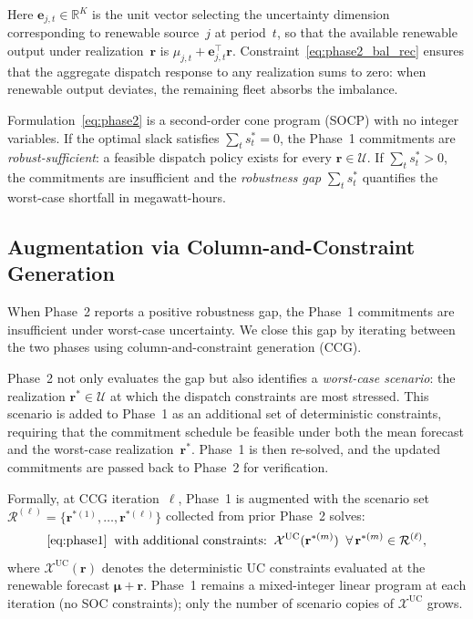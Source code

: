 \documentclass[journal]{IEEEtran}
\begin{document}
Here $\mathbf{e}_{j,t} \in \mathbb{R}^K$ is the unit vector
selecting the uncertainty dimension corresponding to renewable
source~$j$ at period~$t$, so that the available renewable output
under realization~$\mathbf{r}$ is $\mu_{j,t} + \mathbf{e}_{j,t}^\top
\mathbf{r}$.
Constraint~\eqref{eq:phase2_bal_rec} ensures that the aggregate
dispatch response to any realization sums to zero: when renewable
output deviates, the remaining fleet absorbs the imbalance.

Formulation~\eqref{eq:phase2} is a second-order cone program (SOCP)
with no integer variables.
If the optimal slack satisfies $\sum_t s_t^* = 0$, the Phase~1
commitments are \emph{robust-sufficient}: a feasible dispatch policy
exists for every $\mathbf{r} \in \mathcal{U}$.
If $\sum_t s_t^* > 0$, the commitments are insufficient and the
\emph{robustness gap} $\sum_t s_t^*$ quantifies the worst-case
shortfall in megawatt-hours.


\subsection{Augmentation via Column-and-Constraint Generation}
\label{sec:augment}

When Phase~2 reports a positive robustness gap, the Phase~1
commitments are insufficient under worst-case uncertainty.
We close this gap by iterating between the two phases using
column-and-constraint generation (CCG).

Phase~2 not only evaluates the gap but also identifies a
\emph{worst-case scenario}: the realization
$\mathbf{r}^* \in \mathcal{U}$ at which the dispatch constraints are
most stressed.
This scenario is added to Phase~1 as an additional set of
deterministic constraints, requiring that the commitment schedule be
feasible under both the mean forecast and the worst-case
realization~$\mathbf{r}^*$.
Phase~1 is then re-solved, and the updated commitments are passed
back to Phase~2 for verification.

Formally, at CCG iteration~$\ell$, Phase~1 is augmented with the
scenario set $\mathcal{R}^{(\ell)} = \{\mathbf{r}^{*(1)}, \dots,
\mathbf{r}^{*(\ell)}\}$ collected from prior Phase~2 solves:
\begin{equation}\label{eq:ccg_aug}
  \eqref{eq:phase1} \;\;\text{with additional constraints:}\;\;
  \mathcal{X}^{\text{UC}}(\mathbf{r}^{*(m)}) \;\;\forall\,
  \mathbf{r}^{*(m)} \in \mathcal{R}^{(\ell)},
\end{equation}
where $\mathcal{X}^{\text{UC}}(\mathbf{r})$ denotes the
deterministic UC constraints evaluated at the renewable forecast
$\boldsymbol{\mu} + \mathbf{r}$.
Phase~1 remains a mixed-integer linear program at each iteration
(no SOC constraints); only the number of scenario copies of
$\mathcal{X}^{\text{UC}}$ grows.
\end{document}
